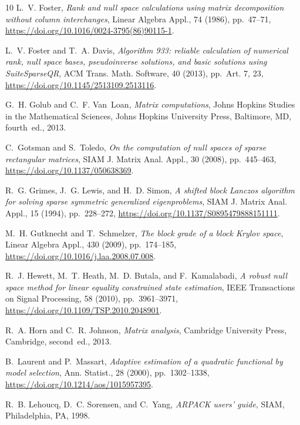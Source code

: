 \documentclass{siamart190516}
\begin{document}
\begin{thebibliography}{10}
{\sc L.~V. Foster}, {\em Rank and null space calculations using matrix
  decomposition without column interchanges}, Linear Algebra Appl., 74 (1986),
  pp.~47--71, \url{https://doi.org/10.1016/0024-3795(86)90115-1}.

{\sc L.~V. Foster and T.~A. Davis}, {\em Algorithm 933: reliable calculation of
  numerical rank, null space bases, pseudoinverse solutions, and basic
  solutions using {S}uite{S}parse{QR}}, ACM Trans. Math. Software, 40 (2013),
  pp.~Art. 7, 23, \url{https://doi.org/10.1145/2513109.2513116}.

{\sc G.~H. Golub and C.~F. Van~Loan}, {\em Matrix computations}, Johns Hopkins
  Studies in the Mathematical Sciences, Johns Hopkins University Press,
  Baltimore, MD, fourth~ed., 2013.

{\sc C.~Gotsman and S.~Toledo}, {\em On the computation of null spaces of
  sparse rectangular matrices}, SIAM J. Matrix Anal. Appl., 30 (2008),
  pp.~445--463, \url{https://doi.org/10.1137/050638369}.

{\sc R.~G. Grimes, J.~G. Lewis, and H.~D. Simon}, {\em A shifted block
  {L}anczos algorithm for solving sparse symmetric generalized eigenproblems},
  SIAM J. Matrix Anal. Appl., 15 (1994), pp.~228--272,
  \url{https://doi.org/10.1137/S0895479888151111}.

{\sc M.~H. Gutknecht and T.~Schmelzer}, {\em The block grade of a block
  {K}rylov space}, Linear Algebra Appl., 430 (2009), pp.~174--185,
  \url{https://doi.org/10.1016/j.laa.2008.07.008}.

{\sc R.~J. Hewett, M.~T. Heath, M.~D. Butala, and F.~Kamalabadi}, {\em A robust
  null space method for linear equality constrained state estimation}, IEEE
  Transactions on Signal Processing, 58 (2010), pp.~3961--3971,
  \url{https://doi.org/10.1109/TSP.2010.2048901}.

{\sc R.~A. Horn and C.~R. Johnson}, {\em Matrix analysis}, Cambridge University
  Press, Cambridge, second~ed., 2013.

{\sc B.~Laurent and P.~Massart}, {\em Adaptive estimation of a quadratic
  functional by model selection}, Ann. Statist., 28 (2000), pp.~1302--1338,
  \url{https://doi.org/10.1214/aos/1015957395}.

{\sc R.~B. Lehoucq, D.~C. Sorensen, and C.~Yang}, {\em A{R}{P}{A}{C}{K} users'
  guide}, SIAM, Philadelphia, PA, 1998.


\end{thebibliography}
\end{document}
